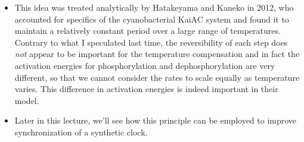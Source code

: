 \documentclass{article}
\begin{document}
\begin{itemize}
\item This idea was treated analytically by Hatakeyama and Kaneko in 2012, who accounted for specifics of the cyanobacterial KaiAC system and found it to maintain a relatively constant period over a large range of temperatures. Contrary to what I speculated last time, the reversibility of each step does \textit{not} appear to be important for the temperature compensation and in fact the activation energies for phosphorylation and dephosphorylation are very different, so that we cannot consider the rates to scale equally as temperature varies. This difference in activation energies is indeed important in their model.
\item Later in this lecture, we'll see how this principle can be employed to improve synchronization of a synthetic clock.
\end{itemize}
\end{document}
